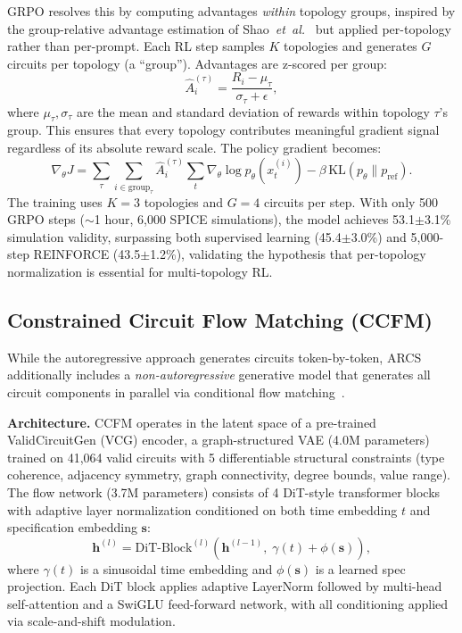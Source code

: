 \documentclass[conference]{IEEEtran}
\begin{document}
GRPO resolves this by computing advantages \emph{within} topology
groups, inspired by the group-relative advantage estimation of
Shao~\emph{et~al.}~\cite{shao2024grpo} but applied per-topology
rather than per-prompt.
Each RL step samples $K$ topologies and generates
$G$ circuits per topology (a ``group''). Advantages are z-scored
per group:
\begin{equation}
\hat{A}_i^{(\tau)} = \frac{R_i - \mu_\tau}{\sigma_\tau + \epsilon},
\label{eq:grpo}
\end{equation}
where $\mu_\tau, \sigma_\tau$ are the mean and standard deviation
of rewards within topology $\tau$'s group. This ensures that every
topology contributes meaningful gradient signal regardless of its
absolute reward scale. The policy gradient becomes:
\begin{equation}
\nabla_\theta J = \sum_\tau \sum_{i \in \text{group}_\tau}
\hat{A}_i^{(\tau)} \sum_t \nabla_\theta \log p_\theta(x_t^{(i)})
- \beta\,\text{KL}(p_\theta \| p_\text{ref}).
\end{equation}
The training uses $K\!=\!3$ topologies and $G\!=\!4$ circuits per step.
With only 500 GRPO steps ($\sim$1 hour, 6,000 SPICE simulations),
the model achieves 53.1$\pm$3.1\% simulation validity, surpassing both
supervised learning (45.4$\pm$3.0\%) and 5,000-step REINFORCE
(43.5$\pm$1.2\%), validating the hypothesis that per-topology normalization
is essential for multi-topology RL.

\subsection{Constrained Circuit Flow Matching (CCFM)}
\label{sec:ccfm}

While the autoregressive approach generates circuits token-by-token,
ARCS additionally includes a \emph{non-autoregressive} generative model
that generates all circuit components in parallel via conditional
flow matching~\cite{lipman2023flow}.

\textbf{Architecture.} CCFM operates in the latent space of a
pre-trained ValidCircuitGen (VCG) encoder, a graph-structured VAE
(4.0M parameters) trained on 41,064 valid circuits with 5
differentiable structural constraints (type coherence, adjacency
symmetry, graph connectivity, degree bounds, value range). The
flow network (3.7M parameters) consists of 4 DiT-style transformer
blocks~\cite{peebles2023dit} with adaptive layer normalization
conditioned on both time embedding $t$ and specification embedding
$\mathbf{s}$:
\begin{equation}
\mathbf{h}^{(l)} = \text{DiT-Block}^{(l)}\!\left(\mathbf{h}^{(l-1)},\;
\gamma(t) + \phi(\mathbf{s})\right),
\end{equation}
where $\gamma(t)$ is a sinusoidal time embedding and $\phi(\mathbf{s})$
is a learned spec projection. Each DiT block applies adaptive LayerNorm
followed by multi-head self-attention and a SwiGLU feed-forward
network, with all conditioning applied via scale-and-shift modulation.
\end{document}

